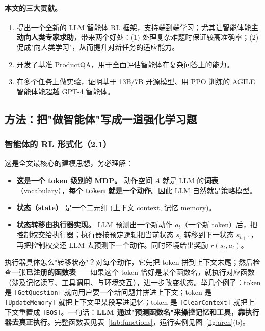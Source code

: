 \documentclass[11pt,UTF8,fontset=fandol]{ctexart}
\begin{document}
\paragraph{本文的三大贡献。}
\begin{enumerate}[leftmargin=1.8em]
\item 提出一个全新的 LLM 智能体 RL 框架，支持端到端学习；尤其让智能体能\textbf{主动向人类专家求助}，带来两个好处：(1) 处理复杂难题时保证较高准确率；(2) 促成"向人类学习"，从而提升对新任务的适应能力。
\item 开发了基准 ProductQA，用于全面评估智能体在复杂问答上的能力。
\item 在多个任务上做实验，证明基于 13B/7B 开源模型、用 PPO 训练的 AGILE 智能体能超越 GPT-4 智能体。
\end{enumerate}

\subsection{方法：把"做智能体"写成一道强化学习题}

\subsubsection{智能体的 RL 形式化（2.1）}

这是全文最核心的建模思想，务必理解：

\begin{itemize}[leftmargin=1.5em]
\item \textbf{这是一个 token 级别的 MDP。} 动作空间 $A$ 就是 LLM 的\textbf{词表}（vocabulary），\textbf{每个 token 就是一个动作}。因此 LLM 自然就是策略模型。
\item \textbf{状态（state）} 是一个二元组 (上下文 context, 记忆 memory)。
\item \textbf{状态转移由执行器实现。} LLM 预测出一个新动作 $a_t$（一个新 token）后，把控制权交给执行器；执行器按预定逻辑把当前状态 $s_t$ 转移到下一状态 $s_{t+1}$，再把控制权交还 LLM 去预测下一个动作。同时环境给出奖励 $r(s_t, a_t)$。
\end{itemize}

执行器具体怎么"转移状态"？对每个动作，它先把 token 拼到上下文末尾；然后检查一张\textbf{已注册的函数表}——如果这个 token 恰好是某个函数名，就执行对应函数（涉及记忆读写、工具调用、与环境交互），进一步改变状态。举几个例子：token 是 \texttt{[GetQuestion]} 就向用户要一个新问题并拼进上下文；token 是 \texttt{[UpdateMemory]} 就把上下文里某段写进记忆；token 是 \texttt{[ClearContext]} 就把上下文重置成 \texttt{[BOS]}。一句话：\textbf{LLM 通过"预测函数名"来操控记忆和工具，靠执行器去真正执行}。完整函数表见表~\ref{tab:functions}，运行实例见图~\ref{fig:arch}(b)。
\end{document}
